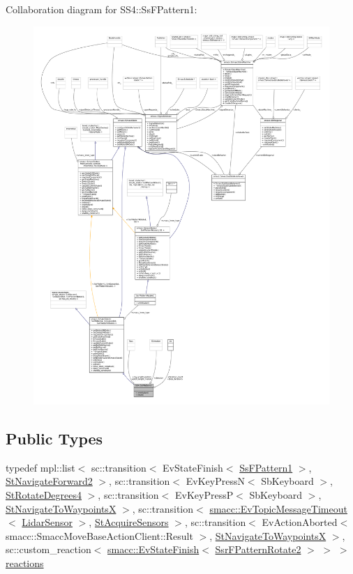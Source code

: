 Collaboration diagram for S\+S4\+:\+:Ss\+F\+Pattern1\+:
\nopagebreak
\begin{figure}[H]
\begin{center}
\leavevmode
\includegraphics[width=350pt]{structSS4_1_1SsFPattern1__coll__graph}
\end{center}
\end{figure}
\subsection*{Public Types}
\begin{DoxyCompactItemize}
\item 
typedef mpl\+::list$<$ sc\+::transition$<$ Ev\+State\+Finish$<$ \hyperlink{structSS4_1_1SsFPattern1}{Ss\+F\+Pattern1} $>$, \hyperlink{structStNavigateForward2}{St\+Navigate\+Forward2} $>$, sc\+::transition$<$ Ev\+Key\+PressN$<$ Sb\+Keyboard $>$, \hyperlink{structStRotateDegrees4}{St\+Rotate\+Degrees4} $>$, sc\+::transition$<$ Ev\+Key\+PressP$<$ Sb\+Keyboard $>$, \hyperlink{structStNavigateToWaypointsX}{St\+Navigate\+To\+WaypointsX} $>$, sc\+::transition$<$ \hyperlink{structsmacc_1_1EvTopicMessageTimeout}{smacc\+::\+Ev\+Topic\+Message\+Timeout}$<$ \hyperlink{sensor__state_8h_a9db9e1944f88de79507758d08e4a2ee3}{Lidar\+Sensor} $>$, \hyperlink{structStAcquireSensors}{St\+Acquire\+Sensors} $>$, sc\+::transition$<$ Ev\+Action\+Aborted$<$ smacc\+::\+Smacc\+Move\+Base\+Action\+Client\+::\+Result $>$, \hyperlink{structStNavigateToWaypointsX}{St\+Navigate\+To\+WaypointsX} $>$, sc\+::custom\+\_\+reaction$<$ \hyperlink{structsmacc_1_1EvStateFinish}{smacc\+::\+Ev\+State\+Finish}$<$ \hyperlink{structSsrFPatternRotate2}{Ssr\+F\+Pattern\+Rotate2} $>$ $>$ $>$ \hyperlink{structSS4_1_1SsFPattern1_a252ae0972a366e62c21282f902bb7085}{reactions}
\end{DoxyCompactItemize}
